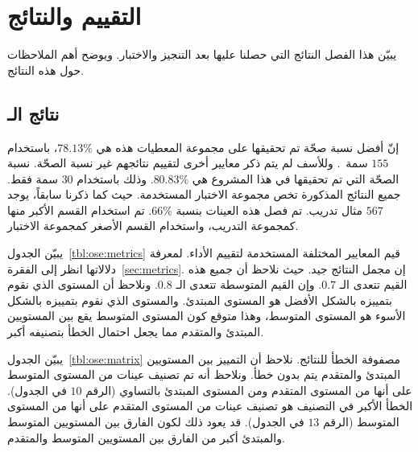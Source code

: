 

\chapter{التقييم والنتائج}
يبيّن هذا الفصل النتائج التي حصلنا عليها بعد التنجيز والاختبار.
ويوضح أهم الملاحظات حول هذه النتائج.

\section{نتائج الـ }
إنّ أفضل نسبة صحّة تم تحقيقها على مجموعة المعطيات هذه هي $78.13\%$،
باستخدام $155$ سمة~\cite{vajjala2018}.
وللأسف لم يتم ذكر معايير أخرى لتقييم نتائجهم غير نسبة الصحّة.
نسبة الصحّة التي تم تحقيقها في هذا المشروع هي $80.83\%$.
وذلك باستخدام $30$ سمة فقط.
جميع النتائج المذكورة تخص مجموعة الاختبار المستخدمة.
حيث كما ذكرنا سابقاً، يوجد $567$ مثال تدريب.
تم فصل هذه العينات بنسبة $66\%$.
تم استخدام القسم الأكبر منها كمجموعة التدريب،
واستخدام القسم الأصغر كمجموعة الاختبار.

يبيّن الجدول~\ref{tbl:ose:metrics} قيم المعايير المختلفة المستخدمة لتقييم الأداء.
لمعرفة دلالاتها انظر إلى الفقرة~\ref{sec:metrics}.
إن مجمل النتائج جيد.
حيث نلاحظ أن جميع هذه القيم تتعدى الـ $0.7$.
وإن القيم المتوسطة تتعدى الـ $0.8$.
ونلاحظ أن المستوى الذي نقوم بتمييزه بالشكل الأفضل هو المستوى المبتدئ.
والمستوى الذي نقوم بتمييزه بالشكل الأسوء هو المستوى المتوسط،
وهذا متوقع كون المستوى المتوسط يقع بين المستويين المبتدئ والمتقدم مما يجعل احتمال الخطأ بتصنيفه أكبر.

يبيّن الجدول~\ref{tbl:ose:matrix} مصفوفة الخطأ للنتائج.
نلاحظ أن التمييز بين المستويين المبتدئ والمتقدم يتم بدون خطأ.
ونلاحظ أنه تم تصنيف عينات من المستوى المتوسط على أنها من المستوى المتقدم ومن المستوى المبتدئ بالتساوي (الرقم $10$ في الجدول).
الخطأ الأكبر في التصنيف هو تصنيف عينات من المستوى المتقدم على أنها من المستوى المتوسط (الرقم $13$ في الجدول).
قد يعود ذلك لكون الفارق بين المستويين المتوسط والمبتدئ أكبر من الفارق بين المستويين المتوسط والمتقدم.

